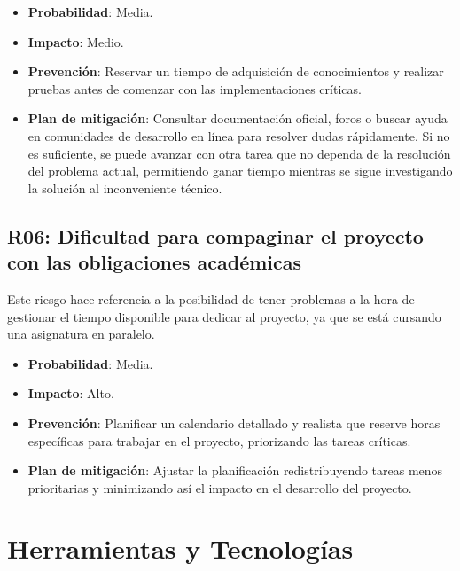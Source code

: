 \begin{itemize}
    \item \textbf{Probabilidad}: Media.
    \item \textbf{Impacto}: Medio.
    \item \textbf{Prevención}: Reservar un tiempo de adquisición de conocimientos y realizar pruebas antes de comenzar con las implementaciones críticas.
    \item \textbf{Plan de mitigación}: Consultar documentación oficial, foros o buscar ayuda en comunidades de desarrollo en línea para resolver dudas rápidamente. Si no es suficiente, se puede avanzar con otra tarea que no dependa de la resolución del problema actual, permitiendo ganar tiempo mientras se sigue investigando la solución al inconveniente técnico.
\end{itemize}

\subsection*{R06: Dificultad para compaginar el proyecto con las obligaciones académicas}
Este riesgo hace referencia a la posibilidad de tener problemas a la hora de gestionar el tiempo disponible para dedicar al proyecto, ya que se está cursando una asignatura en paralelo.

\newpage

\begin{itemize}
    \item \textbf{Probabilidad}: Media.
    \item \textbf{Impacto}: Alto.
    \item \textbf{Prevención}: Planificar un calendario detallado y realista que reserve horas específicas para trabajar en el proyecto, priorizando las tareas críticas.
    \item \textbf{Plan de mitigación}: Ajustar la planificación redistribuyendo tareas menos prioritarias y minimizando así el impacto en el desarrollo del proyecto.
\end{itemize}



\section{Herramientas y Tecnologías}

